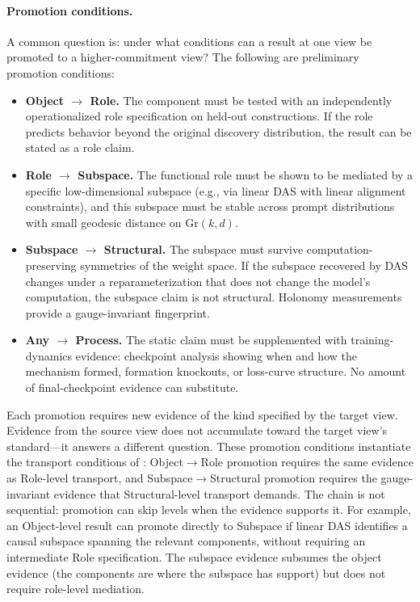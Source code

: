 \documentclass{article}
\newcommand{\Gr}{\mathrm{Gr}}
\begin{document}
\paragraph{Promotion conditions.}
A common question is: under what conditions can a result at one view be
promoted to a higher-commitment view?  The following are preliminary
promotion conditions:
\begin{itemize}[leftmargin=*]
\item \textbf{Object $\to$ Role.}  The component must be tested with an
      independently operationalized role specification on held-out
      constructions.  If the role predicts behavior beyond the original
      discovery distribution, the result can be stated as a role claim.
\item \textbf{Role $\to$ Subspace.}  The functional role must be shown to
      be mediated by a specific low-dimensional subspace (e.g., via linear
      DAS with linear alignment constraints), and this subspace must be stable
      across prompt distributions with small geodesic distance on $\Gr(k,d)$.
\item \textbf{Subspace $\to$ Structural.}  The subspace must survive
      computation-preserving symmetries of the weight space.  If the subspace
      recovered by DAS changes under a reparameterization that does not
      change the model's computation, the subspace claim is not structural.
      Holonomy measurements provide a gauge-invariant fingerprint.
\item \textbf{Any $\to$ Process.}  The static claim must be supplemented
      with training-dynamics evidence: checkpoint analysis showing when and
      how the mechanism formed, formation knockouts, or loss-curve structure.
      No amount of final-checkpoint evidence can substitute.
\end{itemize}
Each promotion requires new evidence of the kind specified by the target
view.  Evidence from the source view does not accumulate toward the
target view's standard---it answers a different question.  These promotion conditions instantiate the transport conditions of \citet{tower2026mechreference}: Object$\to$Role promotion requires the same evidence as Role-level transport, and Subspace$\to$Structural promotion requires the gauge-invariant evidence that Structural-level transport demands.  The chain is
not sequential: promotion can skip levels when the evidence supports it.
For example, an Object-level result can promote directly to Subspace if
linear DAS identifies a causal subspace spanning the relevant components,
without requiring an intermediate Role specification.  The subspace
evidence subsumes the object evidence (the components are where the
subspace has support) but does not require role-level mediation.
\end{document}
